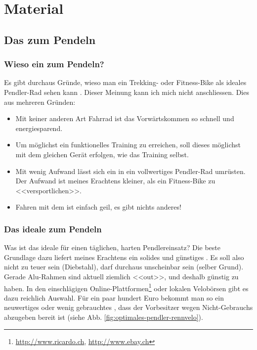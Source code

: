 \chapter{Material}

\section{Das \rv{} zum Pendeln}

\subsection{Wieso ein \rv{} zum Pendeln?}

Es gibt durchaus Gründe, wieso man ein Trekking- oder Fitness-Bike als
ideales Pendler-Rad sehen kann \cite{Lindthaler2015perfektesfahrradpendler}.
Dieser Meinung kann ich mich nicht anschliessen. Dies aus mehreren Gründen:

\begin{itemize}
  \item Mit keiner anderen Art Fahrrad ist das Vorwärtskommen so schnell und energiesparend.
  \item Um möglichst ein funktionelles Training zu erreichen, soll dieses möglichst mit dem
    gleichen Gerät erfolgen, wie das Training selbst.
  \item Mit wenig Aufwand lässt sich ein \rv{} in ein vollwertiges Pendler-Rad umrüsten.
    Der Aufwand ist meines Erachtens kleiner, als ein Fitness-Bike zu <<versportlichen>>.
  \item Fahren mit dem \rv{} ist einfach geil, es gibt nichts anderes!
\end{itemize}

\subsection{Das ideale \rv{} zum Pendeln}

Was ist das ideale \rv{} für einen täglichen, harten Pendlereinsatz?
Die beste Grundlage dazu liefert meines Erachtens ein solides und
günstiges \rv{}. Es soll also nicht zu teuer sein (Diebstahl), darf
durchaus unscheinbar sein (selber Grund). Gerade Alu-Rahmen sind
aktuell ziemlich <<out>>, und deshalb günstig zu haben. In den
einschlägigen Online-Plattformen\footnote{\url{http://www.ricardo.ch},
\url{http://www.ebay.ch}} oder lokalen Velobörsen gibt es dazu reichlich
Auswahl. Für ein paar hundert Euro bekommt man so ein neuwertiges oder wenig
gebrauchtes \rv{}, dass der Vorbesitzer wegen Nicht-Gebrauchs abzugeben bereit
ist (siehe Abb. \ref{fig:optimales-pendler-rennvelo}).


